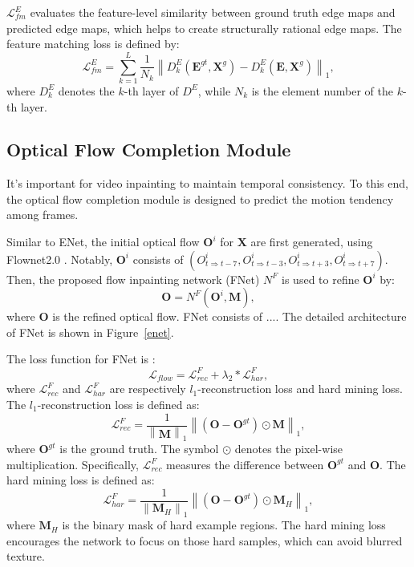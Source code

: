 $\mathcal{L}^E_{fm}$ evaluates the feature-level similarity between ground truth edge maps and predicted edge maps, which helps to create structurally rational edge maps. The feature matching loss is defined by:
\begin{equation}
\label{eq:edge_fm}
\mathcal{L}^E_{fm}=\sum_{k=1}^L{\frac{1}{N_k}\left\| D^E_k(\boldsymbol{E}^{gt},\boldsymbol{X}^{g})- D^E_k(\boldsymbol{E},\boldsymbol{X}^{g})\right\|_1},
\end{equation}
where $D^E_k$ denotes the $k$-th layer of $D^E$, while $N_k$ is the element number of the $k$-th layer.

\subsection{Optical Flow Completion Module}
It's important for video inpainting to maintain temporal consistency.
To this end, the optical flow completion module is designed to predict the motion tendency among frames.

Similar to ENet, the initial optical flow \(\boldsymbol{O}^i\) for $\boldsymbol{X}$ are first generated, using Flownet2.0 \cite{Flownet_2017_CVPR}.
Notably, \(\boldsymbol{O}^i\) consists of \((O^i_{t\Rightarrow t-7},O^i_{t\Rightarrow t-3},O^i_{t\Rightarrow t+3},O^i_{t\Rightarrow t+7})\).
Then, the proposed flow inpainting network (FNet) $N^F$ is used to refine \(\boldsymbol{O}^i\) by:
\begin{equation}
\label{eq:flownet}
\boldsymbol{O}=N^F(\boldsymbol{O}^{i},\boldsymbol{M}),
\end{equation}
where $\boldsymbol{O}$ is the refined optical flow.
FNet consists of ....
The detailed architecture of FNet is shown in Figure~\ref{enet}.

The loss function for FNet is :
\begin{equation}
\label{eq:flow_all}
\mathcal{L}_{flow}=\mathcal{L}^F_{rec}+\lambda_2 * \mathcal{L}^F_{har},
\end{equation}
where $\mathcal{L}^F_{rec}$ and $\mathcal{L}^F_{har}$ are respectively $l_1$-reconstruction loss and hard mining loss.
The $l_1$-reconstruction loss is defined as:
\begin{equation}
\label{eq:flow_l1}
\mathcal{L}^F_{rec}=\frac{1}{\left\|\boldsymbol{M} \right\|_1}\left\|(\boldsymbol{O}-\boldsymbol{O}^{gt})\odot \boldsymbol{M}\right\|_1,
\end{equation}
where $\boldsymbol{O}^{gt}$ is the ground truth. The symbol $\odot$ denotes the pixel-wise multiplication. Specifically, $\mathcal{L}^F_{rec}$ measures the difference between $\boldsymbol{O}^{gt}$ and $\boldsymbol{O}$.
The hard mining loss is defined as:
\begin{equation}
\label{eq:flow_hard}
\mathcal{L}^F_{har}=\frac{1}{\left\|\boldsymbol{M}_H \right\|_1}\left\|(\boldsymbol{O}-\boldsymbol{O}^{gt})\odot \boldsymbol{M}_H\right\|_1,
\end{equation}
where $\boldsymbol{M}_H$ is the binary mask of hard example regions.
The hard mining loss encourages the network to focus on those hard samples, which can avoid blurred texture. 

